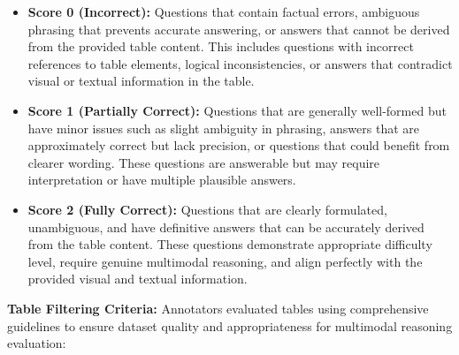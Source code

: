 \documentclass[11pt]{article}
\begin{document}
\begin{itemize}[leftmargin=*,itemsep=0.1em]
    \item \textbf{Score 0 (Incorrect):} Questions that contain factual errors, ambiguous phrasing that prevents accurate answering, or answers that cannot be derived from the provided table content. This includes questions with incorrect references to table elements, logical inconsistencies, or answers that contradict visual or textual information in the table.
    
    \item \textbf{Score 1 (Partially Correct):} Questions that are generally well-formed but have minor issues such as slight ambiguity in phrasing, answers that are approximately correct but lack precision, or questions that could benefit from clearer wording. These questions are answerable but may require interpretation or have multiple plausible answers.
    
    \item \textbf{Score 2 (Fully Correct):} Questions that are clearly formulated, unambiguous, and have definitive answers that can be accurately derived from the table content. These questions demonstrate appropriate difficulty level, require genuine multimodal reasoning, and align perfectly with the provided visual and textual information.
\end{itemize}

\textbf{Table Filtering Criteria:} Annotators evaluated tables using comprehensive guidelines to ensure dataset quality and appropriateness for multimodal reasoning evaluation:
\end{document}
